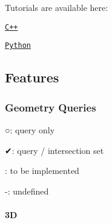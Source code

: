 Tutorials are available here\+:


\begin{DoxyItemize}
\item \href{./tutorials/cpp}{\tt C++}
\item \href{./tutorials/python}{\tt Python}
\end{DoxyItemize}

\subsection*{Features}

\subsubsection*{Geometry Queries}


\begin{DoxyItemize}
\item {\ttfamily ○}\+: query only
\item {\ttfamily ✔}\+: query / intersection set
\item \+: to be implemented
\item {\ttfamily -\/}\+: undefined
\end{DoxyItemize}

\paragraph*{3D}

